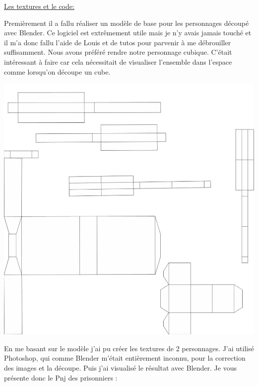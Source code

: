 \documentclass{article}
\begin{document}
\par
\underline{Les textures et le code:}
\newline

\par
Premièrement il a fallu réaliser un modèle de base pour les personnages découpé avec Blender.  Ce logiciel est extrêmement utile mais je n’y avais jamais touché et il m’a donc fallu l’aide de Louis et de tutos pour parvenir à me débrouiller suffisamment. Nous avons préféré rendre notre personnage cubique. C’était intéressant à faire car cela nécessitait de visualiser l’ensemble dans l’espace comme lorsqu’on découpe un cube.
\begin{center}
\includegraphics[scale=0.3]{decoupe.jpg}
\end{center}
\newpage
En me basant sur le modèle j’ai pu créer les textures de 2 personnages. J’ai utilisé Photoshop, qui comme Blender m’était entièrement inconnu, pour la correction des images et la découpe. Puis j’ai visualisé le résultat avec Blender. Je vous présente donc le Pnj des prisonniers :
\newline
\end{document}
